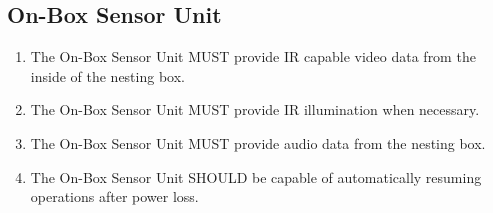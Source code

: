 \documentclass{article}
\begin{document}
\subsection{On-Box Sensor Unit}
\begin{enumerate}
    \item The On-Box Sensor Unit MUST provide IR capable video data from the inside of the nesting box.
    \item The On-Box Sensor Unit MUST provide IR illumination when necessary.
    \item The On-Box Sensor Unit MUST provide audio data from the nesting box.
    \item The On-Box Sensor Unit SHOULD be capable of automatically resuming operations after power loss.
\end{enumerate}
\end{document}
